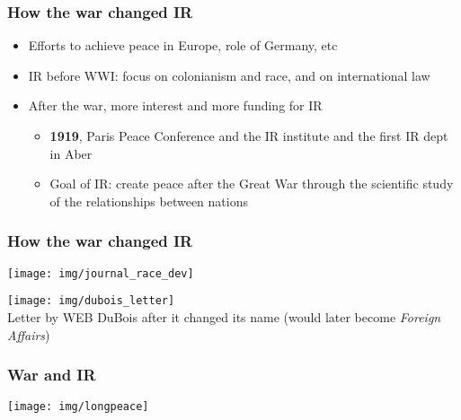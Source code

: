 \documentclass[aspectratio=43,handout]{beamer}
\begin{document}
\begin{frame}
\frametitle{How the war changed IR}
\centering

\begin{itemize}
  \item Efforts to achieve peace in Europe, role of Germany, etc
  \item IR before WWI: focus on colonianism and race, and on international law
  \item After the war, more interest and more funding for IR
  \begin{itemize}
    \item \textbf{1919}, Paris Peace Conference and the IR institute and the first IR dept in Aber
    \item Goal of IR: create peace after the Great War through the scientific study of the relationships between nations
  \end{itemize}
\end{itemize}

\end{frame}

\begin{frame}
\frametitle{How the war changed IR}
\centering

\begin{minipage}{0.49\textwidth}\centering
  \texttt{[image: img/journal\_race\_dev]}
\end{minipage}\hfill
\begin{minipage}{0.49\textwidth}\centering
  \texttt{[image: img/dubois\_letter]}\\{\small Letter by WEB DuBois after it changed its name (would later become \textit{Foreign Affairs})}
\end{minipage}

\end{frame}

\begin{frame}
\frametitle{War and IR}
\centering

\begin{minipage}{.49\textwidth}\centering
\texttt{[image: img/longpeace]}
\end{minipage}\hfill
\begin{minipage}{.49\textwidth}\centering
{}
\end{minipage}

\end{frame}
\end{document}
